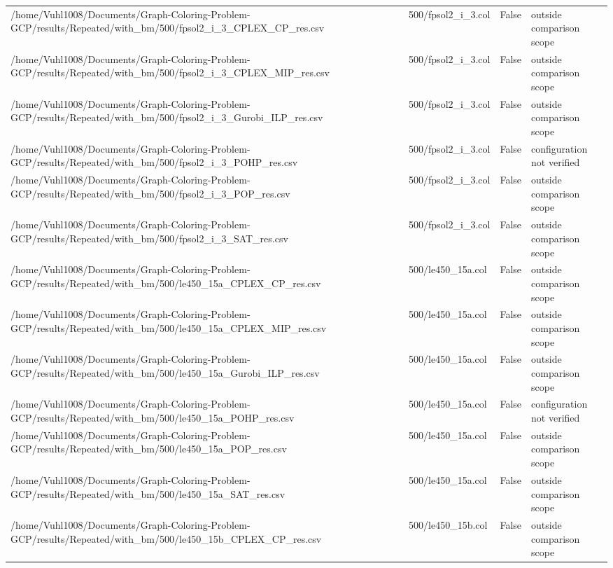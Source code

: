 \begin{table}[htbp]
\begin{tabular}{llll}
/home/Vuhl1008/Documents/Graph-Coloring-Problem-GCP/results/Repeated/with\_bm/500/fpsol2\_i\_3\_CPLEX\_CP\_res.csv & 500/fpsol2\_i\_3.col & False & outside comparison scope \\
/home/Vuhl1008/Documents/Graph-Coloring-Problem-GCP/results/Repeated/with\_bm/500/fpsol2\_i\_3\_CPLEX\_MIP\_res.csv & 500/fpsol2\_i\_3.col & False & outside comparison scope \\
/home/Vuhl1008/Documents/Graph-Coloring-Problem-GCP/results/Repeated/with\_bm/500/fpsol2\_i\_3\_Gurobi\_ILP\_res.csv & 500/fpsol2\_i\_3.col & False & outside comparison scope \\
/home/Vuhl1008/Documents/Graph-Coloring-Problem-GCP/results/Repeated/with\_bm/500/fpsol2\_i\_3\_POHP\_res.csv & 500/fpsol2\_i\_3.col & False & configuration not verified \\
/home/Vuhl1008/Documents/Graph-Coloring-Problem-GCP/results/Repeated/with\_bm/500/fpsol2\_i\_3\_POP\_res.csv & 500/fpsol2\_i\_3.col & False & outside comparison scope \\
/home/Vuhl1008/Documents/Graph-Coloring-Problem-GCP/results/Repeated/with\_bm/500/fpsol2\_i\_3\_SAT\_res.csv & 500/fpsol2\_i\_3.col & False & outside comparison scope \\
/home/Vuhl1008/Documents/Graph-Coloring-Problem-GCP/results/Repeated/with\_bm/500/le450\_15a\_CPLEX\_CP\_res.csv & 500/le450\_15a.col & False & outside comparison scope \\
/home/Vuhl1008/Documents/Graph-Coloring-Problem-GCP/results/Repeated/with\_bm/500/le450\_15a\_CPLEX\_MIP\_res.csv & 500/le450\_15a.col & False & outside comparison scope \\
/home/Vuhl1008/Documents/Graph-Coloring-Problem-GCP/results/Repeated/with\_bm/500/le450\_15a\_Gurobi\_ILP\_res.csv & 500/le450\_15a.col & False & outside comparison scope \\
/home/Vuhl1008/Documents/Graph-Coloring-Problem-GCP/results/Repeated/with\_bm/500/le450\_15a\_POHP\_res.csv & 500/le450\_15a.col & False & configuration not verified \\
/home/Vuhl1008/Documents/Graph-Coloring-Problem-GCP/results/Repeated/with\_bm/500/le450\_15a\_POP\_res.csv & 500/le450\_15a.col & False & outside comparison scope \\
/home/Vuhl1008/Documents/Graph-Coloring-Problem-GCP/results/Repeated/with\_bm/500/le450\_15a\_SAT\_res.csv & 500/le450\_15a.col & False & outside comparison scope \\
/home/Vuhl1008/Documents/Graph-Coloring-Problem-GCP/results/Repeated/with\_bm/500/le450\_15b\_CPLEX\_CP\_res.csv & 500/le450\_15b.col & False & outside comparison scope \\

\end{tabular}
\end{table}
